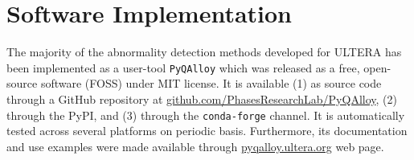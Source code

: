 \section{Software Implementation} \label{pyqalloy:sec:software}

The majority of the abnormality detection methods developed for ULTERA has been implemented as a user-tool \texttt{PyQAlloy} which was released as a free, open-source software (FOSS) under MIT license. It is available (1) as source code through a GitHub repository at \href{https://github.com/PhasesResearchLab/PyQAlloy}{github.com/PhasesResearchLab/PyQAlloy}, (2) through the PyPI, and (3) through the \texttt{conda-forge} channel. It is automatically tested across several platforms on periodic basis. Furthermore, its documentation and use examples were made available through \href{https://pyqalloy.ultera.org/}{pyqalloy.ultera.org} web page.




\printbibliography[heading=subbibintoc]